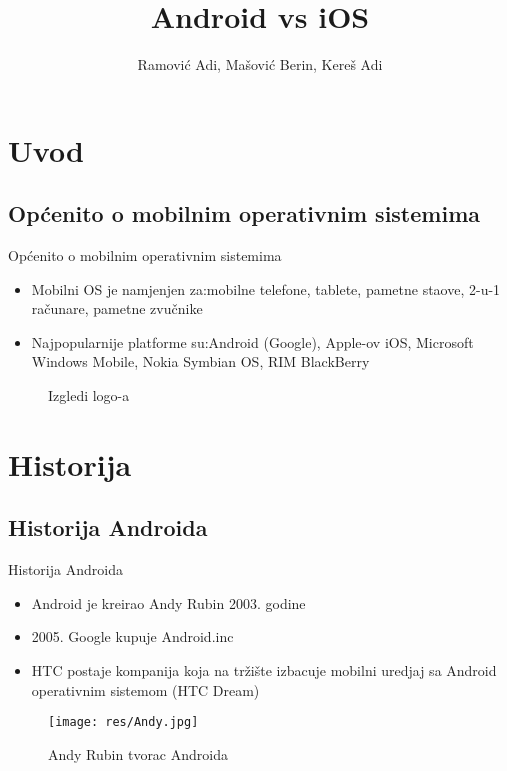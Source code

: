 \documentclass{beamer}
\begin{document}
\title{Android vs iOS}
\author{Ramović Adi, Mašović Berin, Kereš Adi}
\begin{frame}
\titlepage
\end{frame}
\section{Uvod}
\subsection{Općenito o mobilnim operativnim sistemima}
\begin{frame}{Općenito o mobilnim operativnim sistemima}
\begin{itemize}
\item Mobilni OS je namjenjen za:mobilne telefone, tablete, pametne staove, 2-u-1 računare, pametne zvučnike
\item Najpopularnije platforme  su:Android (Google), Apple-ov iOS, Microsoft Windows Mobile, Nokia Symbian OS, RIM BlackBerry
\end{itemize} 
\begin{figure}[H]
\centering
\captionsetup{}
\caption{Izgledi logo-a}
\label{fig: RIM BlackBerry}
\end{figure}
\end{frame}
\section{Historija}
\subsection{Historija Androida}
\begin{frame}{Historija Androida}
\begin{itemize}
\item Android je kreirao Andy Rubin 2003. godine
\item 2005. Google kupuje Android.inc
\item HTC postaje kompanija koja na tržište izbacuje mobilni uredjaj sa Android operativnim sistemom (HTC Dream)
\end{itemize}
\begin{figure}[h]
\centering
\captionsetup{}
\texttt{[image: res/Andy.jpg]}
\caption{Andy Rubin tvorac Androida}
\end{figure}
\end{frame}
\end{document}
